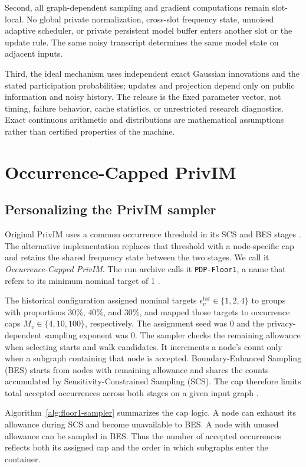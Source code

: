 Second, all graph-dependent sampling and gradient computations remain slot-local. No global private normalization, cross-slot frequency state, unnoised adaptive scheduler, or private persistent model buffer enters another slot or the update rule. The same noisy transcript determines the same model state on adjacent inputs.

Third, the ideal mechanism uses independent exact Gaussian innovations and the stated participation probabilities; updates and projection depend only on public information and noisy history. The release is the fixed parameter vector, not timing, failure behavior, cache statistics, or unrestricted research diagnostics. Exact continuous arithmetic and distributions are mathematical assumptions rather than certified properties of the machine.

\section{Occurrence-Capped PrivIM}\label{sec:floor1}
\subsection{Personalizing the PrivIM sampler}
Original PrivIM uses a common occurrence threshold in its SCS and BES stages \cite{hou2025}. The alternative implementation replaces that threshold with a node-specific cap and retains the shared frequency state between the two stages. We call it \emph{Occurrence-Capped PrivIM}. The run archive calls it \texttt{PDP-Floor1}, a name that refers to its minimum nominal target of 1 \cite{floor1runs}.

The historical configuration assigned nominal targets $\epsilon_v^{\mathrm{tar}}\in\{1,2,4\}$ to groups with proportions $30\%$, $40\%$, and $30\%$, and mapped those targets to occurrence caps $M_v\in\{4,10,100\}$, respectively. The assignment seed was 0 and the privacy-dependent sampling exponent was 0. The sampler checks the remaining allowance when selecting starts and walk candidates. It increments a node's count only when a subgraph containing that node is accepted. Boundary-Enhanced Sampling (BES) starts from nodes with remaining allowance and shares the counts accumulated by Sensitivity-Constrained Sampling (SCS). The cap therefore limits total accepted occurrences across both stages on a given input graph \cite{floor1runs}.

Algorithm~\ref{alg:floor1-sampler} summarizes the cap logic. A node can exhaust its allowance during SCS and become unavailable to BES. A node with unused allowance can be sampled in BES. Thus the number of accepted occurrences reflects both its assigned cap and the order in which subgraphs enter the container.

